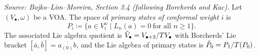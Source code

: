 
\begin{definition}[PrimaryStates]
  \label{def:primary-states}
  \textit{Source: Bojko--Lim--Moreira, Section 3.4 (following Borcherds and Kac).}
  Let \((V_\bullet, \omega)\) be a VOA. The space of \emph{primary states of
  conformal weight \(i\)} is
  \[P_i \coloneqq \{a \in V_i^\omega \mid L_n(a) = 0\ \text{for all } n \geq 1\}.\]
  The associated Lie algebra quotient is
  \(\widecheck{V}_\bullet = V_{\bullet+2} / T V_\bullet\) with Borcherds' Lie bracket
  \([\bar{a}, \bar{b}] = \overline{a_{(0)} b}\), and the Lie algebra of primary states
  is \(\widecheck{P}_0 = P_1 / T(P_0)\).
\end{definition}


